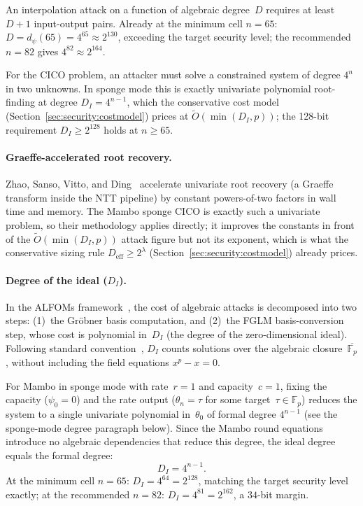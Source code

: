 \documentclass[11pt,a4paper]{article}
\theoremstyle{definition}
\newcommand{\Fp}{\mathbb{F}_p}
\begin{document}
An interpolation attack on a function of algebraic degree~$D$ requires at
least $D+1$ input-output pairs. Already at the minimum cell $n = 65$:
$D = d_\psi(65) = 4^{65} \approx 2^{130}$, exceeding the target
security level; the recommended $n = 82$ gives
$4^{82} \approx 2^{164}$.

For the CICO problem, an attacker must solve a constrained system of
degree $4^n$ in two unknowns. In sponge mode this is exactly
univariate polynomial root-finding at degree $D_I = 4^{n-1}$, which
the conservative cost model
(Section~\ref{sec:security:costmodel}) prices at
$\widetilde{O}(\min(D_I, p))$; the 128-bit requirement
$D_I \ge 2^{128}$ holds at $n \ge 65$.

\paragraph{Graeffe-accelerated root recovery.}
Zhao, Sanso, Vitto, and Ding~\cite{Graeffe_Poseidon_NTT} accelerate
univariate root recovery (a Graeffe transform inside the NTT
pipeline) by constant powers-of-two factors in wall time and memory.
The Mambo sponge CICO is exactly such a univariate problem, so their
methodology applies directly; it improves the constants in front of
the $\widetilde{O}(\min(D_I, p))$ attack figure but not its exponent,
which is what the conservative sizing rule
$D_{\mathrm{eff}} \ge 2^{\lambda}$
(Section~\ref{sec:security:costmodel}) already prices.

\paragraph{Degree of the ideal ($D_I$).}
In the ALFOMs framework~\cite{ALFOMs}, the cost of algebraic attacks
is decomposed into two steps: (1)~the Gr\"obner basis computation, and
(2)~the FGLM basis-conversion step, whose cost is polynomial in~$D_I$
(the degree of the zero-dimensional ideal). Following standard
convention~\cite{ALFOMs,Griffin_break,Anemoi_attack}, $D_I$ counts
solutions over the algebraic closure~$\overline{\Fp}$, without
including the field equations $x^p - x = 0$.

For Mambo in sponge mode with rate~$r=1$ and capacity~$c=1$, fixing
the capacity ($\psi_0 = 0$) and the rate output ($\theta_n = \tau$
for some target~$\tau \in \Fp$) reduces the system to a single
univariate polynomial in~$\theta_0$ of formal degree $4^{n-1}$
(see the sponge-mode degree paragraph below). Since the Mambo round
equations introduce no algebraic dependencies that reduce this degree,
the ideal degree equals the formal degree:
\[
  D_I = 4^{n-1}.
\]
At the minimum cell $n = 65$: $D_I = 4^{64} = 2^{128}$, matching the
target security level exactly; at the recommended $n = 82$:
$D_I = 4^{81} = 2^{162}$, a $34$-bit margin.
\end{document}
